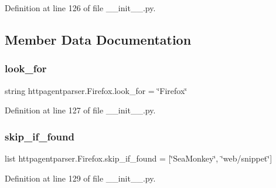 Definition at line 126 of file \+\_\+\+\_\+init\+\_\+\+\_\+.\+py.



\subsection{Member Data Documentation}
\hypertarget{classhttpagentparser_1_1_firefox_ac31233f472837790577b7e22eb10583d}{}\label{classhttpagentparser_1_1_firefox_ac31233f472837790577b7e22eb10583d} 
\subsubsection{\texorpdfstring{look\+\_\+for}{look\_for}}
{\footnotesize\ttfamily string httpagentparser.\+Firefox.\+look\+\_\+for = \char`\"{}Firefox\char`\"{}\hspace{0.3cm}{\ttfamily [static]}}



Definition at line 127 of file \+\_\+\+\_\+init\+\_\+\+\_\+.\+py.

\hypertarget{classhttpagentparser_1_1_firefox_ad5ccd2de1e5754309628f85bcfb753a4}{}\label{classhttpagentparser_1_1_firefox_ad5ccd2de1e5754309628f85bcfb753a4} 
\subsubsection{\texorpdfstring{skip\+\_\+if\+\_\+found}{skip\_if\_found}}
{\footnotesize\ttfamily list httpagentparser.\+Firefox.\+skip\+\_\+if\+\_\+found = \mbox{[}\char`\"{}Sea\+Monkey\char`\"{}, \char`\"{}web/snippet\char`\"{}\mbox{]}\hspace{0.3cm}{\ttfamily [static]}}



Definition at line 129 of file \+\_\+\+\_\+init\+\_\+\+\_\+.\+py.

\hypertarget{classhttpagentparser_1_1_firefox_ac02dcb3e2250b7f4be5129cfcc52bb1d}{}\label{classhttpagentparser_1_1_firefox_ac02dcb3e2250b7f4be5129cfcc52bb1d} 
